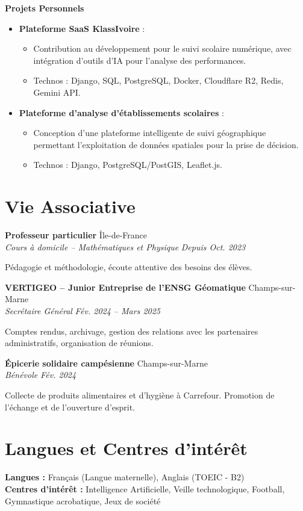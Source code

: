 \documentclass[11pt, a4paper]{article}
\newcommand{\cventry}[4]{
    \vspace{0.1cm}
    \noindent \textbf{#1} \hfill #2 \\
    \noindent \textit{#3} \hfill \textit{#4} \par
    \vspace{0.05cm}
}
\begin{document}
\vspace{0.2cm}
\noindent \textbf{Projets Personnels}
\begin{itemize}[leftmargin=0.5cm, nosep]
    \item \textbf{Plateforme SaaS KlassIvoire} :
    \begin{itemize}[leftmargin=0.5cm, nosep]
        \item Contribution au développement pour le suivi scolaire numérique, avec intégration d’outils d'IA pour l'analyse des performances.
        \item Technos : Django, SQL, PostgreSQL, Docker, Cloudflare R2, Redis, Gemini API.
    \end{itemize}
    \item \textbf{Plateforme d'analyse d'établissements scolaires} :
    \begin{itemize}[leftmargin=0.5cm, nosep]
        \item Conception d’une plateforme intelligente de suivi géographique permettant l’exploitation de données spatiales pour la prise de décision.
        \item Technos : Django, PostgreSQL/PostGIS, Leaflet.js.
    \end{itemize}
\end{itemize}

\section*{Vie Associative}

\cventry{Professeur particulier}{Île-de-France}{Cours à domicile -- Mathématiques et Physique}{Depuis Oct. 2023}
\noindent Pédagogie et méthodologie, écoute attentive des besoins des élèves.

\cventry{VERTIGEO -- Junior Entreprise de l'ENSG Géomatique}{Champs-sur-Marne}{Secrétaire Général}{Fév. 2024 -- Mars 2025}
\noindent Comptes rendus, archivage, gestion des relations avec les partenaires administratifs, organisation de réunions.

\cventry{Épicerie solidaire campésienne}{Champs-sur-Marne}{Bénévole}{Fév. 2024}
\noindent Collecte de produits alimentaires et d'hygiène à Carrefour. Promotion de l'échange et de l'ouverture d'esprit.

\section*{Langues et Centres d'intérêt}
\noindent \textbf{Langues :} Français (Langue maternelle), Anglais (TOEIC - B2) \\[0.1cm]
\textbf{Centres d'intérêt :} Intelligence Artificielle, Veille technologique, Football, Gymnastique acrobatique, Jeux de société
\end{document}
